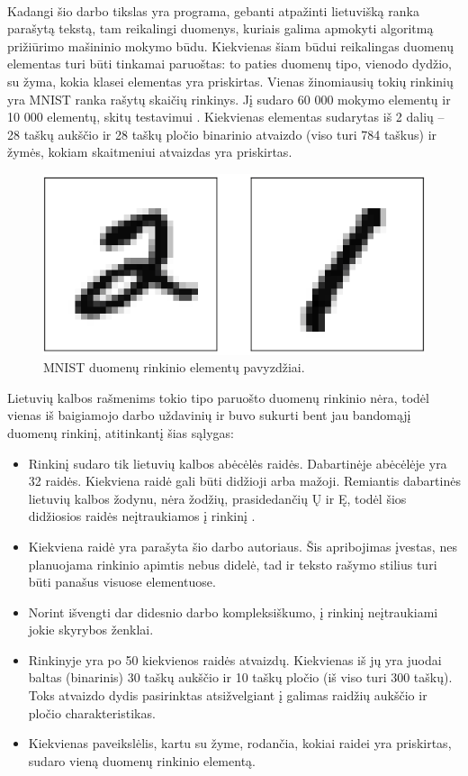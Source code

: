 \documentclass[a4paper,12pt]{article}
\begin{document}
\paragraph{} Kadangi šio darbo tikslas yra programa, gebanti atpažinti lietuvišką ranka parašytą tekstą, tam reikalingi duomenys, kuriais galima apmokyti algoritmą prižiūrimo mašininio mokymo būdu. Kiekvienas šiam būdui reikalingas duomenų elementas turi būti tinkamai paruoštas: to paties duomenų tipo, vienodo dydžio, su žyma, kokia klasei elementas yra priskirtas. Vienas žinomiausių tokių rinkinių yra MNIST ranka rašytų skaičių rinkinys. Jį sudaro 60 000 mokymo elementų ir 10 000 elementų, skitų testavimui \cite{MNIST}. Kiekvienas elementas sudarytas iš 2 dalių – 28 taškų aukščio ir 28  taškų pločio binarinio atvaizdo (viso turi 784 taškus) ir žymės, kokiam skaitmeniui atvaizdas yra priskirtas.
		\begin{figure}[H]
			\centering
			\includegraphics[scale=0.2]{images/mnist}
			\caption{MNIST duomenų rinkinio elementų pavyzdžiai.}   %
			\label{img:mnist}
		\end{figure}

Lietuvių kalbos rašmenims tokio tipo paruošto duomenų rinkinio nėra, todėl vienas iš baigiamojo darbo uždavinių ir buvo sukurti bent jau bandomąjį duomenų rinkinį, atitinkantį šias sąlygas:
\begin{itemize}
	\item Rinkinį sudaro tik lietuvių kalbos abėcėlės raidės. Dabartinėje abėcėlėje yra 32 raidės. Kiekviena raidė gali būti didžioji arba mažoji. Remiantis dabartinės lietuvių kalbos žodynu, nėra žodžių, prasidedančių Ų ir Ę, todėl šios didžiosios raidės neįtraukiamos į rinkinį \cite{DLKZ}.
	\item Kiekviena raidė yra parašyta šio darbo autoriaus. Šis apribojimas įvestas, nes planuojama rinkinio apimtis nebus didelė, tad ir teksto rašymo stilius turi būti panašus visuose elementuose.
	\item Norint išvengti dar didesnio darbo kompleksiškumo, į rinkinį neįtraukiami jokie skyrybos ženklai.
	\item Rinkinyje yra po 50 kiekvienos raidės atvaizdų. Kiekvienas iš jų yra juodai baltas (binarinis) 30 taškų aukščio ir 10 taškų pločio (iš viso turi 300 taškų). Toks atvaizdo dydis pasirinktas atsižvelgiant į galimas raidžių aukščio ir pločio charakteristikas.
	\item Kiekvienas paveikslėlis, kartu su žyme, rodančia, kokiai raidei yra priskirtas, sudaro vieną duomenų rinkinio elementą.  
\end{itemize}
\end{document}
